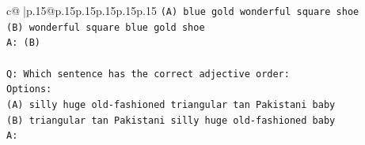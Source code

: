\documentclass{article}
\begin{document}
{\begin{supertabular}{c@{$\;$}|p{.15\linewidth}@{}p{.15\linewidth}p{.15\linewidth}p{.15\linewidth}p{.15\linewidth}p{.15\linewidth}}
{{{\texttt{(A) blue gold wonderful square shoe} \\
\texttt{(B) wonderful square blue gold shoe} \\
\texttt{A: (B)} \\
\\ 
\texttt{Q: Which sentence has the correct adjective order:} \\
\texttt{Options:} \\
\texttt{(A) silly huge old{-}fashioned triangular tan Pakistani baby} \\
\texttt{(B) triangular tan Pakistani silly huge old{-}fashioned baby} \\
\texttt{A:} \\
            }
        }
    }
     \\ \\


\end{supertabular}}
\end{document}
